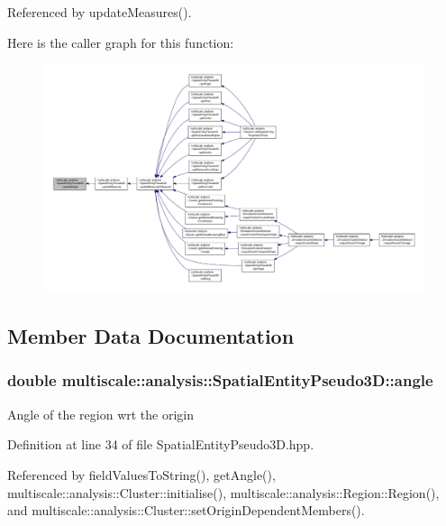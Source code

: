 Referenced by update\-Measures().



Here is the caller graph for this function\-:\nopagebreak
\begin{figure}[H]
\begin{center}
\leavevmode
\includegraphics[width=350pt]{classmultiscale_1_1analysis_1_1SpatialEntityPseudo3D_ad50d0866df26b63dc86853a9ab0c545d_icgraph}
\end{center}
\end{figure}




\subsection{Member Data Documentation}
\hypertarget{classmultiscale_1_1analysis_1_1SpatialEntityPseudo3D_aa077aab864e659f93522863cc10824bb}{
\subsubsection[{angle}]{\setlength{\rightskip}{0pt plus 5cm}double multiscale\-::analysis\-::\-Spatial\-Entity\-Pseudo3\-D\-::angle\hspace{0.3cm}{\ttfamily [protected]}}}\label{classmultiscale_1_1analysis_1_1SpatialEntityPseudo3D_aa077aab864e659f93522863cc10824bb}
Angle of the region wrt the origin 

Definition at line 34 of file Spatial\-Entity\-Pseudo3\-D.\-hpp.



Referenced by field\-Values\-To\-String(), get\-Angle(), multiscale\-::analysis\-::\-Cluster\-::initialise(), multiscale\-::analysis\-::\-Region\-::\-Region(), and multiscale\-::analysis\-::\-Cluster\-::set\-Origin\-Dependent\-Members().

